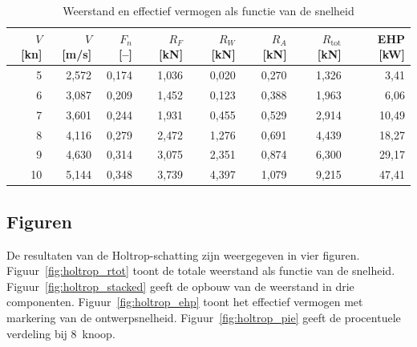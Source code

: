 \begin{table}[H]
\centering
\caption{Weerstand en effectief vermogen als functie van de snelheid}
\label{tab:holtrop_speed_series}
\begin{tabular}{rrrrrrrr}
\toprule
$V$ [kn] & $V$ [m/s] & $F_n$ [–] & $R_F$ [kN] & $R_W$ [kN] & $R_A$ [kN]
         & $R_\mathrm{tot}$ [kN] & EHP [kW] \\
\midrule
5  & 2{,}572 & 0{,}174 & 1{,}036 & 0{,}020 & 0{,}270 & 1{,}326 &  3{,}41 \\
6  & 3{,}087 & 0{,}209 & 1{,}452 & 0{,}123 & 0{,}388 & 1{,}963 &  6{,}06 \\
7  & 3{,}601 & 0{,}244 & 1{,}931 & 0{,}455 & 0{,}529 & 2{,}914 & 10{,}49 \\
\rowcolor{green!15}
8  & 4{,}116 & 0{,}279 & 2{,}472 & 1{,}276 & 0{,}691 & 4{,}439 & 18{,}27 \\
9  & 4{,}630 & 0{,}314 & 3{,}075 & 2{,}351 & 0{,}874 & 6{,}300 & 29{,}17 \\
10 & 5{,}144 & 0{,}348 & 3{,}739 & 4{,}397 & 1{,}079 & 9{,}215 & 47{,}41 \\
\bottomrule
\end{tabular}
\end{table}
 
\subsection{Figuren}
\label{subsec:holtrop-figuren}
 
De resultaten van de Holtrop-schatting zijn weergegeven in vier figuren.
Figuur~\ref{fig:holtrop_rtot} toont de totale weerstand als functie van de snelheid.
Figuur~\ref{fig:holtrop_stacked} geeft de opbouw van de weerstand in drie componenten.
Figuur~\ref{fig:holtrop_ehp} toont het effectief vermogen met markering van de
ontwerpsnelheid. Figuur~\ref{fig:holtrop_pie} geeft de procentuele verdeling bij 8~knoop.
 
